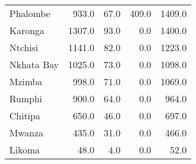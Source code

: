 \begin{tabular}{lrrrr}
Phalombe      &    933.0 &    67.0 &    409.0 &    1409.0 \\
Karonga       &   1307.0 &    93.0 &      0.0 &    1400.0 \\
Ntchisi       &   1141.0 &    82.0 &      0.0 &    1223.0 \\
Nkhata Bay    &   1025.0 &    73.0 &      0.0 &    1098.0 \\
Mzimba        &    998.0 &    71.0 &      0.0 &    1069.0 \\
Rumphi        &    900.0 &    64.0 &      0.0 &     964.0 \\
Chitipa       &    650.0 &    46.0 &      0.0 &     697.0 \\
Mwanza        &    435.0 &    31.0 &      0.0 &     466.0 \\
Likoma        &     48.0 &     4.0 &      0.0 &      52.0 \\
\bottomrule
\end{tabular}
